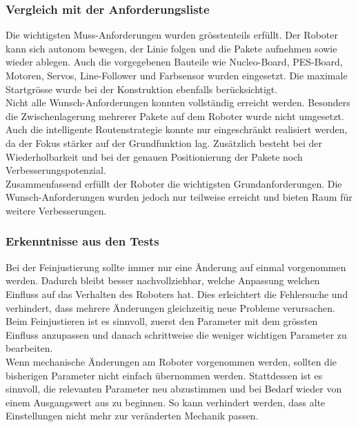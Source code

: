 \documentclass[11pt,a4paper]{article}
\begin{document}
	\subsubsection{Vergleich mit der Anforderungsliste}
		
	Die wichtigsten Muss-Anforderungen wurden grösstenteils erfüllt. Der Roboter kann sich autonom bewegen, der Linie folgen und die Pakete aufnehmen sowie wieder ablegen. Auch die vorgegebenen Bauteile wie Nucleo-Board, PES-Board, Motoren, Servos, Line-Follower und Farbsensor wurden eingesetzt. Die maximale Startgrösse wurde bei der Konstruktion ebenfalls berücksichtigt.\\
	
	\noindent
	Nicht alle Wunsch-Anforderungen konnten vollständig erreicht werden. Besonders die Zwischenlagerung mehrerer Pakete auf dem Roboter wurde nicht umgesetzt. Auch die intelligente Routenstrategie konnte nur eingeschränkt realisiert werden, da der Fokus stärker auf der Grundfunktion lag. Zusätzlich besteht bei der Wiederholbarkeit und bei der genauen Positionierung der Pakete noch Verbesserungspotenzial.\\
	
	\noindent
	Zusammenfassend erfüllt der Roboter die wichtigsten Grundanforderungen. Die Wunsch-Anforderungen wurden jedoch nur teilweise erreicht und bieten Raum für weitere Verbesserungen.
		
	\subsubsection{Erkenntnisse aus den Tests}
	
	\noindent
	Bei der Feinjustierung sollte immer nur eine Änderung auf einmal vorgenommen werden. Dadurch bleibt besser nachvollziehbar, welche Anpassung welchen Einfluss auf das Verhalten des Roboters hat. Dies erleichtert die Fehlersuche und verhindert, dass mehrere Änderungen gleichzeitig neue Probleme verursachen. Beim Feinjustieren ist es sinnvoll, zuerst den Parameter mit dem grössten Einfluss anzupassen und danach schrittweise die weniger wichtigen Parameter zu bearbeiten.\\
	
	\noindent
	Wenn mechanische Änderungen am Roboter vorgenommen werden, sollten die bisherigen Parameter nicht einfach übernommen werden. Stattdessen ist es sinnvoll, die relevanten Parameter neu abzustimmen und bei Bedarf wieder von einem Ausgangswert aus zu beginnen. So kann verhindert werden, dass alte Einstellungen nicht mehr zur veränderten Mechanik passen.\\
	
\end{document}

